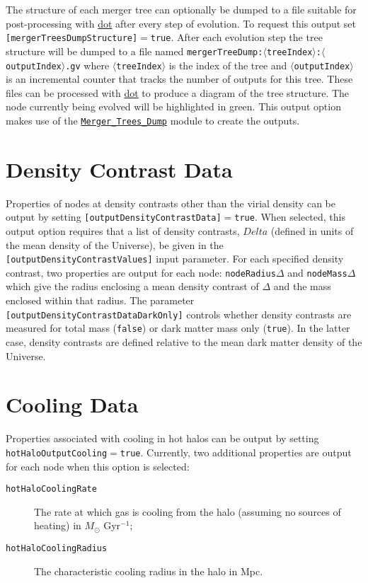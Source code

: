 The structure of each merger tree can optionally be dumped to a file suitable for post-processing with \href{http://www.graphviz.org/}{\sc dot} after every step of evolution. To request this output set {\tt [mergerTreesDumpStructure]}$=${\tt true}. After each evolution step the tree structure will be dumped to a file named {\tt mergerTreeDump:$\langle$treeIndex$\rangle$:$\langle$outputIndex$\rangle$.gv} where $\langle${\tt treeIndex}$\rangle$ is the index of the tree and $\langle${\tt outputIndex}$\rangle$ is an incremental counter that tracks the number of outputs for this tree. These files can be processed with \href{http://www.graphviz.org/}{\sc dot} to produce a diagram of the tree structure. The node currently being evolved will be highlighted in green. This output option makes use of the \hyperlink{objects.merger_trees.dump.F90:merger_trees_dump}{\tt Merger\_Trees\_Dump} module to create the outputs.

\section{Density Contrast Data}

Properties of nodes at density contrasts other than the virial density can be output by setting {\tt [outputDensityContrastData]}$=${\tt true}. When selected, this output option requires that a list of density contrasts, $Delta$ (defined in units of the mean density of the Universe), be given in the {\tt [outputDensityContrastValues]} input parameter. For each specified density contrast, two properties are output for each node: {\tt nodeRadius}$\Delta$ and {\tt nodeMass}$\Delta$ which give the radius enclosing a mean density contrast of $\Delta$ and the mass enclosed within that radius. The parameter {\tt [outputDensityContrastDataDarkOnly]} controls whether density contrasts are measured for total mass ({\tt false}) or dark matter mass only ({\tt true}). In the latter case, density contrasts are defined relative to the mean dark matter density of the Universe.

\section{Cooling Data}

Properties associated with cooling in hot halos can be output by setting {\tt hotHaloOutputCooling}$=${\tt true}. Currently, two additional properties are output for each node when this option is selected:
\begin{description}
\item[{\tt hotHaloCoolingRate}] The rate at which gas is cooling from the halo (assuming no sources of heating) in $M_\odot$ Gyr$^{-1}$;
\item[{\tt hotHaloCoolingRadius}] The characteristic cooling radius in the halo in Mpc.
\end{description}


